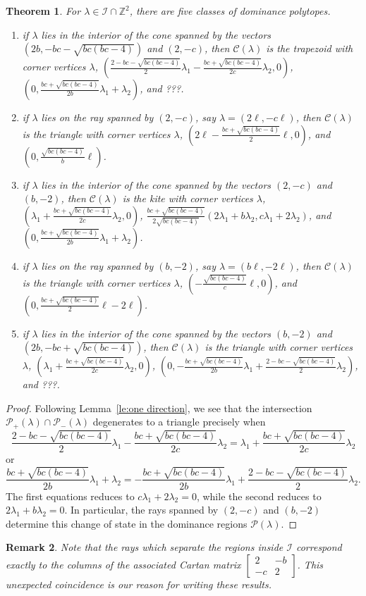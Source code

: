 \documentclass{amsart}
\newtheorem{theorem}{Theorem}
\newtheorem{remark}[theorem]{Remark}
\numberwithin{theorem}{section}
\newcommand{\cC}{\mathcal{C}}
\newcommand{\cI}{\mathcal{I}}
\newcommand{\cP}{\mathcal{P}}
\newcommand{\ZZ}{\mathbb{Z}}
\begin{document}
  \begin{theorem}
    For $\lambda\in\cI\cap\ZZ^2$, there are five classes of dominance polytopes.
    \begin{enumerate}
      \item if $\lambda$ lies in the interior of the cone spanned by the vectors $(2b,-bc-\sqrt{bc(bc-4)})$ and $(2,-c)$, then $\cC(\lambda)$ is the trapezoid with corner vertices $\lambda$, $(\frac{2-bc-\sqrt{bc(bc-4)}}{2}\lambda_1-\frac{bc+\sqrt{bc(bc-4)}}{2c}\lambda_2,0)$, $(0,\frac{bc+\sqrt{bc(bc-4)}}{2b}\lambda_1+\lambda_2)$, and ???.
      \item if $\lambda$ lies on the ray spanned by $(2,-c)$, say $\lambda=(2\ell,-c\ell)$, then $\cC(\lambda)$ is the triangle with corner vertices $\lambda$, $(2\ell-\frac{bc+\sqrt{bc(bc-4)}}{2}\ell,0)$, and $(0,\frac{\sqrt{bc(bc-4)}}{b}\ell)$.
      \item if $\lambda$ lies in the interior of the cone spanned by the vectors $(2,-c)$ and $(b,-2)$, then $\cC(\lambda)$ is the kite with corner vertices $\lambda$, $(\lambda_1+\frac{bc+\sqrt{bc(bc-4)}}{2c}\lambda_2,0)$, $\frac{bc+\sqrt{bc(bc-4)}}{2\sqrt{bc(bc-4)}}(2\lambda_1+b\lambda_2,c\lambda_1+2\lambda_2)$, and $(0,\frac{bc+\sqrt{bc(bc-4)}}{2b}\lambda_1+\lambda_2)$.
      \item if $\lambda$ lies on the ray spanned by $(b,-2)$, say $\lambda=(b\ell,-2\ell)$, then $\cC(\lambda)$ is the triangle with corner vertices $\lambda$, $(-\frac{\sqrt{bc(bc-4)}}{c}\ell,0)$, and $(0,\frac{bc+\sqrt{bc(bc-4)}}{2}\ell-2\ell)$.
      \item if $\lambda$ lies in the interior of the cone spanned by the vectors $(b,-2)$ and $(2b,-bc+\sqrt{bc(bc-4)})$, then $\cC(\lambda)$ is the triangle with corner vertices $\lambda$, $(\lambda_1+\frac{bc+\sqrt{bc(bc-4)}}{2c}\lambda_2,0)$, $(0,-\frac{bc+\sqrt{bc(bc-4)}}{2b}\lambda_1+\frac{2-bc-\sqrt{bc(bc-4)}}{2}\lambda_2)$, and ???.
    \end{enumerate}
  \end{theorem}
  \begin{proof}
    Following Lemma~\ref{le:one direction}, we see that the intersection $\cP_+(\lambda)\cap\cP_-(\lambda)$ degenerates to a triangle precisely when
    \[\frac{2-bc-\sqrt{bc(bc-4)}}{2}\lambda_1-\frac{bc+\sqrt{bc(bc-4)}}{2c}\lambda_2=\lambda_1+\frac{bc+\sqrt{bc(bc-4)}}{2c}\lambda_2\]
    or 
    \[\frac{bc+\sqrt{bc(bc-4)}}{2b}\lambda_1+\lambda_2=-\frac{bc+\sqrt{bc(bc-4)}}{2b}\lambda_1+\frac{2-bc-\sqrt{bc(bc-4)}}{2}\lambda_2.\]
    The first equations reduces to $c\lambda_1+2\lambda_2=0$, while the second reduces to $2\lambda_1+b\lambda_2=0$.
    In particular, the rays spanned by $(2,-c)$ and $(b,-2)$ determine this change of state in the dominance regions $\cP(\lambda)$.
  \end{proof}

  \begin{remark}
    Note that the rays which separate the regions inside $\cI$ correspond exactly to the columns of the associated Cartan matrix $\left[ \begin{array}{cc} 2 & -b \\ -c & 2 \end{array} \right]$.
    This unexpected coincidence is our reason for writing these results.
  \end{remark}
\end{document}
